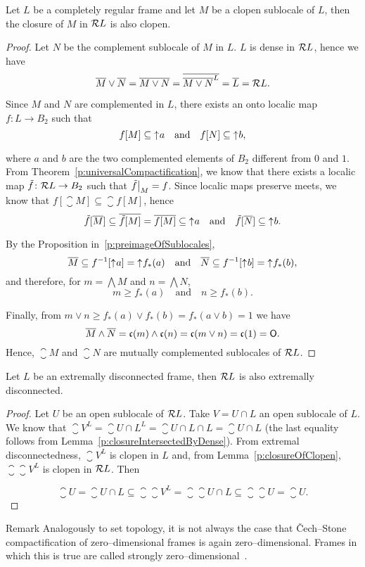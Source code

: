 \begin{lemma}\label{p:closureOfClopen}
    Let $L$ be a completely regular frame and let $M$ be a clopen sublocale of $L$, then the closure of $M$ in $\mathcal{R} L$ is also clopen.
\end{lemma}
\begin{proof}
    Let $N$ be the complement sublocale of $M$ in $L$. $L$ is dense in $\mathcal{R} L$, hence we have
    $$ \overline{M}\vee \overline{N} = \overline{M\vee N} = \overline{\overline{M\vee N}^L} = \overline{L} = \mathcal{R} L. $$

    Since $M$ and $N$ are complemented in $L$, there exists an onto localic map $f\colon L\to B_2$ such that
    $$ f[M] \subseteq \mathord{\uparrow}\mkern1mu a\quad\text{and}\quad f[N]\subseteq \mathord{\uparrow}\mkern1mu b, $$

    \noindent where $a$ and $b$ are the two complemented elements of $B_2$ different from $0$ and $1$.
    From Theorem~\ref{p:universalCompactification}, we know that there exists a localic map $\tilde f\colon \mathcal{R} L\to B_2$ such that $\restr{\tilde f}{M} = f$.
    Since localic maps preserve meets, we know that $f[\closure M]\subseteq \closure{f[M]}$, hence
    $$ \tilde f[\overline{M}] \subseteq \overline{\tilde f[M]} = \overline{f[M]} \subseteq \mathord{\uparrow}\mkern1mu a\quad\text{and}\quad \tilde f[\overline{N}] \subseteq \mathord{\uparrow}\mkern1mu b. $$

    \noindent By the Proposition in~\ref{p:preimageOfSublocales},
    $$ \overline{M} \subseteq f^{-1}[\mathord{\uparrow}\mkern1mu a] = \mathord{\uparrow}\mkern1mu f_*(a) \quad\text{and}\quad \overline{N} \subseteq f^{-1}[\mathord{\uparrow}\mkern1mu b] = \mathord{\uparrow}\mkern1mu f_*(b), $$
    and therefore, for $m = \bigwedge M$ and $n = \bigwedge N$,
    $$ m \geq f_*(a)\quad\text{and}\quad n \geq f_*(b).$$

    \noindent Finally, from $m\vee n \geq f_*(a)\vee f_*(b) = f_*(a\vee b) = 1$ we have
    $$ \overline{M}\wedge \overline{N} = \mathfrak{c}(m)\wedge \mathfrak{c}(n) = \mathfrak{c}(m\vee n) = \mathfrak{c}(1) = \mathsf{O}. $$
    Hence, $\closure{M}$ and $\closure{N}$ are mutually complemented sublocales of $\mathcal{R} L$.
\end{proof}

\begin{proposition}\label{p:extrDiscPreserv}
    Let $L$ be an extremally disconnected frame, then $\mathcal{R} L$ is also extremally disconnected.
\end{proposition}
\begin{proof}
    Let $U$ be an open sublocale of $\mathcal{R} L$. Take $V = U\cap L$ an open sublocale of $L$. We know that $\closure V^L = \closure{U\cap L}^L = \closure{U\cap L}\cap L = \closure U\cap L$ (the last equality follows from Lemma~\ref{p:closureIntersectedByDense}). From extremal disconnectedness, $\closure V^L$ is clopen in $L$ and, from Lemma~\ref{p:closureOfClopen}, $\closure{\closure V^L}$ is clopen in $\mathcal{R} L$. Then

    $$ \closure U = \closure{U\cap L} \subseteq \closure{\closure{V}^L} = \closure{\closure U\cap L} \subseteq \closure{\closure U} = \closure U.$$
\end{proof}

\begin{block}{Remark}
    Analogously to set topology, it is not always the case that Čech--Stone compactification of zero--dimensional frames is again zero--dimensional. Frames in which this is true are called strongly zero--dimensional~\cite{kou2002strongly}.
\end{block}
